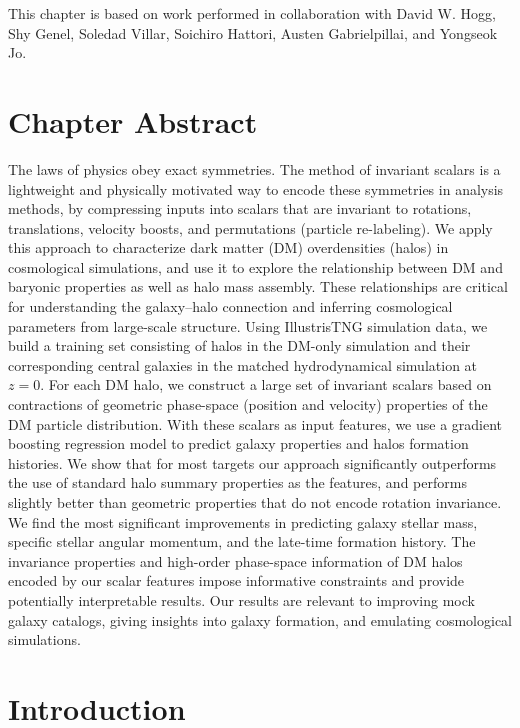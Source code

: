 This chapter is based on work performed in collaboration with David W. Hogg, Shy Genel, Soledad Villar, Soichiro Hattori, Austen Gabrielpillai, and Yongseok Jo.

\graphicspath{{figures/figures_eqcosmo/}}


\section{Chapter Abstract}
The laws of physics obey exact symmetries.
The method of invariant scalars is a lightweight and physically motivated way to encode these symmetries in analysis methods, by compressing inputs into scalars that are invariant to rotations, translations, velocity boosts, and permutations (particle re-labeling).
We apply this approach to characterize dark matter (DM) overdensities (halos) in cosmological simulations, and use it to explore the relationship between DM and baryonic properties as well as halo mass assembly.
These relationships are critical for understanding the galaxy--halo connection and inferring cosmological parameters from large-scale structure.
Using IllustrisTNG simulation data, we build a training set consisting of halos in the DM-only simulation and their corresponding central galaxies in the matched hydrodynamical simulation at $z=0$. 
For each DM halo, we construct a large set of invariant scalars based on contractions of geometric phase-space (position and velocity) properties of the DM particle distribution.
With these scalars as input features, we use a gradient boosting regression model to predict galaxy properties and halos formation histories.
We show that for most targets our approach significantly outperforms the use of standard halo summary properties as the features, and performs slightly better than geometric properties that do not encode rotation invariance.
We find the most significant improvements in predicting galaxy stellar mass, specific stellar angular momentum, and the late-time formation history.
The invariance properties and high-order phase-space information of DM halos encoded by our scalar features impose informative constraints and provide potentially interpretable results.
Our results are relevant to improving mock galaxy catalogs, giving insights into galaxy formation, and emulating cosmological simulations.


\section{Introduction}


